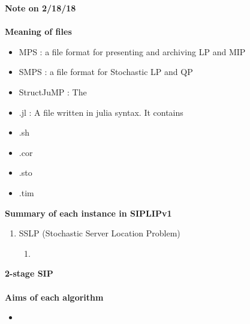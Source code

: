 \documentclass[11pt,english]{article}
\begin{document}
\newpage
{\Large \textbf{Note on 2/18/18}}\\ \\
\textbf{Meaning of files}
\begin{itemize}
	\item MPS : a file format for presenting and archiving LP and MIP
	\item SMPS : a file format for Stochastic LP and QP
	\item StructJuMP : The 
	\item .jl : A file written in julia syntax. It contains 
	\item .sh
	\item .cor
	\item .sto
	\item .tim
\end{itemize}

\newpage
\textbf{Summary of each instance in SIPLIPv1}
\begin{enumerate}
	\item SSLP (Stochastic Server Location Problem)
	\begin{enumerate}
		\item 
	\end{enumerate}
\end{enumerate}
\newpage
{\Large\textbf{2-stage SIP}}\\ \\
\textbf{Aims of each algorithm}
\begin{itemize}
	\item 
\end{itemize}
\end{document}

